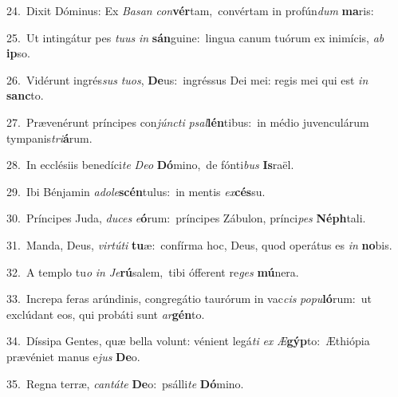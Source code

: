 {\numbfont\textcolor{\numbcolor}{24.}}~Dixit Dóminus: Ex \textit{Ba}\-\textit{san} \textit{con}\-\textbf{vér}tam,~\star convértam in profún\textit{dum} \textbf{ma}\-ris:\par
{\numbfont\textcolor{\numbcolor}{25.}}~Ut intingátur pes \textit{tu}\-\textit{us} \textit{in} \textbf{sán}\-guine:~\star lingua canum tuórum ex inimícis, \textit{ab} \textbf{ip}\-so.\par
{\numbfont\textcolor{\numbcolor}{26.}}~Vidérunt ingrés\textit{sus} \textit{tu}\-\textit{os}, \textbf{De}\-us:~\star ingréssus Dei mei: regis mei qui est \textit{in} \textbf{sanc}\-to.\par
{\numbfont\textcolor{\numbcolor}{27.}}~Prævenérunt príncipes con\-\textit{júnc}\-\textit{ti} \textit{psal}\-\textbf{lén}tibus:~\star in médio juvenculárum tympanis\-\textit{tri}\-\textbf{á}rum.\par
{\numbfont\textcolor{\numbcolor}{28.}}~In ecclésiis benedíci\textit{te} \textit{De}\-\textit{o} \textbf{Dó}\-mino,~\star de fónti\textit{bus} \textbf{Is}\-raël.\par
{\numbfont\textcolor{\numbcolor}{29.}}~Ibi Bénjamin \textit{ad}\-\textit{o}\textit{le}\textbf{scén}tulus:~\star in mentis \textit{ex}\-\textbf{cés}su.\par
{\numbfont\textcolor{\numbcolor}{30.}}~Príncipes Juda, \textit{du}\-\textit{ces} \textit{e}\-\textbf{ó}rum:~\star príncipes Zábulon, prínci\textit{pes} \textbf{Néph}\-tali.\par
{\numbfont\textcolor{\numbcolor}{31.}}~Manda, Deus, \textit{vir}\-\textit{tú}\textit{ti} \textbf{tu}\-æ:~\star confírma hoc, Deus, quod operátus es \textit{in} \textbf{no}\-bis.\par
{\numbfont\textcolor{\numbcolor}{32.}}~A templo tu\textit{o} \textit{in} \textit{Je}\-\textbf{rú}salem,~\star tibi ófferent re\textit{ges} \textbf{mú}\-nera.\par
{\numbfont\textcolor{\numbcolor}{33.}}~Increpa feras arúndinis, congregátio taurórum in vac\textit{cis} \textit{po}\-\textit{pu}\textbf{ló}rum:~\star ut exclúdant eos, qui probáti sunt \textit{ar}\-\textbf{gén}to.\par
{\numbfont\textcolor{\numbcolor}{34.}}~Díssipa Gentes, quæ bella volunt: vénient legá\textit{ti} \textit{ex} \textit{Æ}\-\textbf{gýp}to:~\star Æthiópia prævéniet manus e\textit{jus} \textbf{De}\-o.\par
{\numbfont\textcolor{\numbcolor}{35.}}~Regna terræ, \textit{can}\-\textit{tá}\textit{te} \textbf{De}\-o:~\star psálli\textit{te} \textbf{Dó}\-mino.\par

